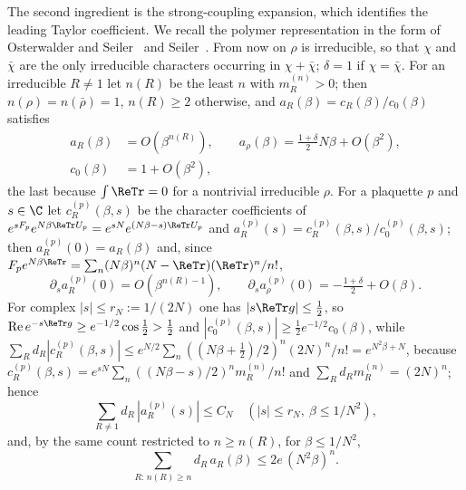 The second ingredient is the strong-coupling expansion, which identifies
the leading Taylor coefficient. We recall the polymer representation in
the form of Osterwalder and Seiler~\cite{OSei78} and Seiler~\cite{Sei82}.
From now on $\rho$ is irreducible, so that $\chi$ and $\bar\chi$ are the
only irreducible characters occurring in $\chi+\bar\chi$; $\delta=1$ if
$\chi=\bar\chi$. For an irreducible $R\ne1$ let $n(R)$ be the least $n$
with $m^{(n)}_R>0$; then $n(\rho)=n(\bar\rho)=1$, $n(R)\ge2$ otherwise,
and $a_R(\beta)=c_R(\beta)/c_0(\beta)$ satisfies
\begin{equation}\label{rEtwo:eqactivity}
\begin{aligned}
a_R(\beta)&=O(\beta^{n(R)}),\qquad a_\rho(\beta)=\tfrac{1+\delta}2N\beta+
O(\beta^2),\\
c_0(\beta)&=1+O(\beta^2),
\end{aligned}
\end{equation}
the last because $\int\ReTr=0$ for a nontrivial irreducible $\rho$. For a
plaquette $p$ and $s\in\C$ let $c^{(p)}_R(\beta,s)$ be the character
coefficients of $e^{sF_p}e^{N\beta\ReTr U_p}=e^{sN}e^{(N\beta-s)\ReTr U_p}$
and $a^{(p)}_R(s)=c^{(p)}_R(\beta,s)/c^{(p)}_0(\beta,s)$; then $a^{(p)}_R(0)
=a_R(\beta)$ and, since $F_pe^{N\beta\ReTr}=\sum_n(N\beta)^n(N-\ReTr)
(\ReTr)^n/n!$,
\begin{equation}\label{rEtwo:eqsource}
\partial_sa^{(p)}_R(0)=O(\beta^{n(R)-1}),\qquad\partial_sa^{(p)}_\rho(0)=
-\tfrac{1+\delta}2+O(\beta).
\end{equation}
For complex $|s|\le r_N:=1/(2N)$ one has $|s\ReTr g|\le\frac12$, so
$\operatorname{Re}e^{-s\ReTr g}\ge e^{-1/2}\cos\frac12>\frac12$ and
$|c^{(p)}_0(\beta,s)|\ge\frac12e^{-1/2}c_0(\beta)$, while
$\sum_Rd_R|c^{(p)}_R(\beta,s)|\le e^{N/2}\sum_n((N\beta+\frac12)/2)^n(2N)^n/
n!=e^{N^2\beta+N}$, because $c^{(p)}_R(\beta,s)=e^{sN}\sum_n((N\beta-s)/2)^n
m^{(n)}_R/n!$ and $\sum_Rd_Rm^{(n)}_R=(2N)^n$; hence
\begin{equation}\label{rEtwo:eqsourcebound}
\sum_{R\ne1}d_R\,|a^{(p)}_R(s)|\le C_N\quad(|s|\le r_N,\ \beta\le1/N^2),
\end{equation}
and, by the same count restricted to $n\ge n(R)$, for $\beta\le1/N^2$,
\[
\sum_{R:\,n(R)\ge n}d_R\,a_R(\beta)\le2e\,(N^2\beta)^n.
\]

